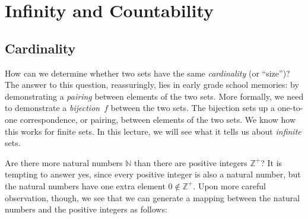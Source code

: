 \documentclass[11pt,fleqn]{article}
\begin{document}
\maketitle


\renewcommand{\F}{\mathbb{F}}
\renewcommand{\Z}{\mathbb{Z}}
\renewcommand{\Q}{\mathbb{Q}}
\renewcommand{\R}{\mathbb{R}}
\renewcommand{\N}{\mathbb{N}}
\newcommand{\C}{\mathbb{C}}


\section*{Infinity and Countability}

\noindent
\subsection*{Cardinality}

How can we determine whether two sets have the same {\it cardinality\/} (or
``size'')?
The answer to this question, reassuringly, lies in early grade school
memories: by demonstrating a {\it pairing\/} between elements of the two sets.
More formally, we need to demonstrate a {\it bijection\/}~$f$ between the two sets.
The bijection sets up a one-to-one correspondence, or pairing, between elements of
the two sets. We know how this works for finite sets.
In this lecture, we will see what it tells us about {\it infinite\/} sets.

Are there more natural numbers $\mathbb{N}$ than there are positive integers
$\mathbb{Z^+}$? It is tempting to answer yes, since every positive integer is
also a natural number, but the natural numbers have one extra element
$0 \notin \mathbb{Z^+}$. Upon more careful observation, though, we see that we can
generate a mapping between the natural numbers and the positive integers as follows:
\end{document}
